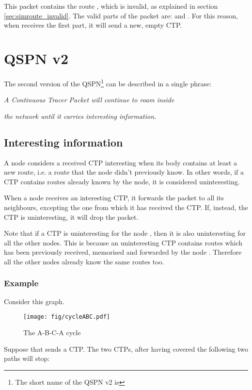 \documentclass[a4paper]{article}
\begin{document}
This packet contains the route , which is
invalid, as explained in section \ref{sec:simroute_invalid}.
The valid parts of the packet are:  and . For this reason, when  receives the first part, it will send a new,
empty CTP.

\section{QSPN v2}
\label{sec:QSPNv2}
The second version of the QSPN\footnote{The short name of the QSPN v2 is
} can be described in a single phrase:

\emph{A Continuous Tracer Packet will continue to roam inside}

\emph{the network until it carries interesting information.}

\subsection{Interesting information}
\label{sec:interesting_info}

A node considers a received CTP interesting when its body contains at least a
new route, i.e. a route that the node didn't previously know.
In other words, if a CTP contains routes already known by the node, it is
considered uninteresting.

When a node receives an interesting CTP, it forwards the packet to all its
neighbours, excepting the one from which it has received the CTP.
If, instead, the CTP is uninteresting, it will drop the packet.

Note that if a CTP is uninteresting for the node , then it is also
uninteresting for all the other nodes. This is because an uninteresting CTP
contains routes which has been previously received, memorised and forwarded
by the node . Therefore all the other nodes already know the same
routes too.

\subsubsection*{Example}
\label{sec:cycle_qv2_example}

Consider this graph.
\begin{figure}[h]
	\begin{center}
		\texttt{[image: fig/cycleABC.pdf]}
	\end{center}
	\caption{The A-B-C-A cycle}
	\label{fig:A-B-C-A}
\end{figure}
Suppose that  sends a CTP. 
The two CTPs, after having covered the following two paths will stop:
\end{document}
